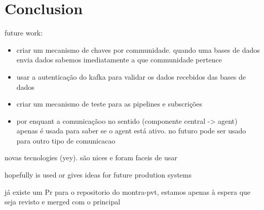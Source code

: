 \chapter{Conclusion}
\label{chapter:conclusion}

future work:
\begin{itemize}
    \item criar um mecanismo de chaves por communidade. quando uma bases de dados envia dados sabemos imediatamente a que communidade pertence
    \item usar a autenticação do kafka para validar os dados recebidos das bases de dados
    \item criar um mecanismo de teste para as pipelines e subscrições
    \item por enquant a comunicaçãoo no sentido (componente central -> agent) apenas é usada para saber se o agent está ativo. no futuro pode ser usado para outro tipo de comunicacao
\end{itemize}

novas tecnologies (yey). são nices e foram faceis de usar

hopefully is used or gives ideas for future prodution systems

já existe um Pr para o repositorio do montra-pvt, estamos apenas à espera que seja revisto e merged com o principal
